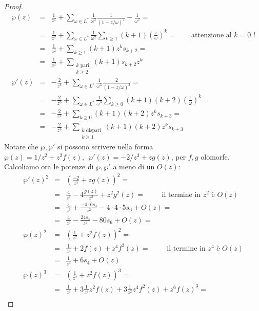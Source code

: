 \begin{proof}
\begin{eqnarray*}
\wp(z) & = & \frac{1}{z^2} + \sum_{\omega \in L^*} \frac{1}{\omega^2} \frac{1}{(1-z/\omega)^2} - \frac{1}{\omega^2} = \\
       & = & \frac{1}{z^2} + \sum_{\omega \in L^*} \frac{1}{\omega^2} \sum_{k \ge 1} (k+1) \left ( \frac{z}{\omega} \right ) ^k =  \qquad \text{attenzione al $k = 0$ !}\\
       & = & \frac{1}{z^2} + \sum_{k \ge 1} (k+1) z^k s_{k+2} = \\
       & = & \frac{1}{z^2} + \sum_{\substack{k \text{ pari} \\ k \ge 2}} (k+1)s_{k+2} z^k \\
\wp'(z)& = & -\frac{2}{z^3}+ \sum_{\omega \in L^*} \frac{1}{\omega^3} \frac{2}{(1-z/\omega)^3}= \\
       & = & -\frac{2}{z^3}+ \sum_{\omega \in L^*} \frac{1}{\omega^3} \sum_{k \ge 0} (k+1)(k+2) \left ( \frac{z}{\omega} \right ) ^k =\\
       & = & -\frac{2}{z^3} + \sum_{k \ge 0} (k+1)(k+2) z^k s_{k+3} =\\
       & = & -\frac{2}{z^3} + \sum_{\substack{k \text{ dispari} \\ k \ge 1}} (k+1)(k+2) z^k s_{k+3}
\end{eqnarray*}
Notare che $\wp, \wp'$ si possono scrivere nella forma $\wp(z) = 1/z^2 + z^2 f(z), \ \ \wp'(z) = -2/z^3 + zg(z)$, per $f,g$ olomorfe. Calcoliamo ora le potenze di $\wp, \wp'$ a meno di un $O(z)$:
\begin{eqnarray*}
\wp'(z)^2 & = & \left ( \frac{-2}{z^3} + zg(z) \right )^2 = \\
          & = & \frac{4}{z^6} -4\frac{g(z)}{z^2} + z^2g^2(z) = \qquad \text{ il termine in } z^2 \text{ è } O(z)\\
          & = & \frac{4}{z^6} +\frac{-4 \cdot 6s_4 }{z^2} -4 \cdot 4 \cdot 5 s_6 + O(z) = \\
          & = & \frac{4}{z^6} - \frac{24s_4 }{z^2} -80s_6 + O(z) = \\
\wp(z)^2  & = & \left ( \frac{1}{z^2} + z^2f(z) \right )^2 = \\
          & = & \frac{1}{z^4} +2f(z) + z^4f^2(z) = \qquad \text{ il termine in } z^4 \text{ è } O(z)\\
          & = & \frac{1}{z^4} + 6s_4 + O(z) \\
\wp(z)^3  & = & \left ( \frac{1}{z^2} + z^2f(z) \right )^3 = \\
          & = & \frac{1}{z^6} +3\frac{1}{z^4}z^2f(z) + 3 \frac{1}{z^2} z^4 f^2(z) + z^6f(z)^3 = \\

\end{eqnarray*}
\end{proof}
